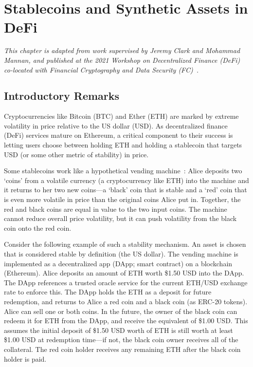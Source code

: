 \chapter{Stablecoins and Synthetic Assets in DeFi} \label{ch:dai}


\textit{
This chapter is adapted from work supervised by Jeremy Clark and Mohammad Mannan, and published at the 2021 Workshop on Decentralized Finance (DeFi) co-located with Financial Cryptography and Data Security (FC)~\cite{salehi2021red}.
}


\section{Introductory Remarks}

Cryptocurrencies like Bitcoin (BTC) and Ether (ETH) are marked by extreme volatility in price relative to the US dollar (USD). As decentralized finance (DeFi) services mature on Ethereum, a critical component to their success is letting users choose between holding ETH and holding a stablecoin that targets USD (or some other metric of stability) in price.

Some stablecoins work like a hypothetical vending machine~\cite{CDM20}: Alice deposits two `coins' from a volatile currency (\eg a cryptocurrency like ETH) into the machine and it returns to her two new coins---a `black' coin that is stable and a `red' coin that is even more volatile in price than the original coins Alice put in. Together, the red and black coins are equal in value to the two input coins. The machine cannot reduce overall price volatility, but it can push volatility from the black coin onto the red coin. 

Consider the following example of such a stability mechanism. An asset is chosen that is considered stable by definition (\eg the US dollar). The vending machine is implemented as a decentralized app (DApp; \aka smart contract) on a blockchain (\eg Ethereum). Alice deposits an amount of ETH worth \$1.50 USD into the DApp. The DApp references a trusted oracle service for the current ETH/USD exchange rate to enforce this. The DApp holds the ETH as a deposit for future redemption, and returns to Alice a red coin and a black coin (\eg as ERC-20 tokens). Alice can sell one or both coins. In the future, the owner of the black coin can redeem it for ETH from the DApp, and receive the equivalent of \$1.00 USD. This assumes the initial deposit of \$1.50 USD worth of ETH is still worth at least \$1.00 USD at redemption time---if not, the black coin owner receives all of the collateral. The red coin holder receives any remaining ETH after the black coin holder is paid.

